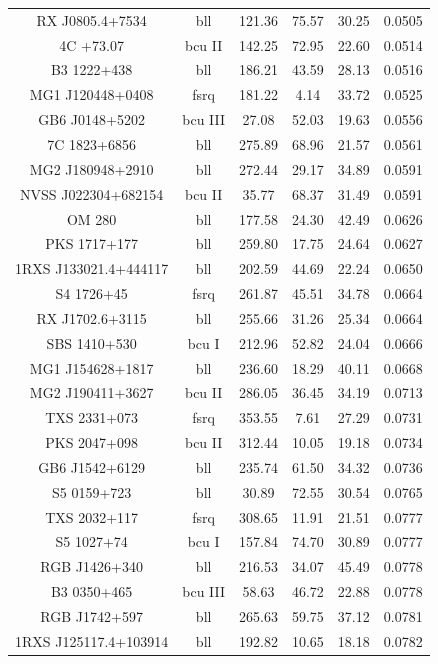 \begin{center}
\begin{longtable}{||cccccc||}
RX J0805.4+7534 &  bll  & 121.36 & 75.57 & 30.25 & 0.0505  \\
4C +73.07 &  bcu II  & 142.25 & 72.95 & 22.60 & 0.0514  \\
B3 1222+438 &  bll  & 186.21 & 43.59 & 28.13 & 0.0516  \\
MG1 J120448+0408 &  fsrq  & 181.22 & 4.14 & 33.72 & 0.0525  \\
GB6 J0148+5202 &  bcu III  & 27.08 & 52.03 & 19.63 & 0.0556  \\
7C 1823+6856 &  bll  & 275.89 & 68.96 & 21.57 & 0.0561  \\
MG2 J180948+2910 &  bll  & 272.44 & 29.17 & 34.89 & 0.0591  \\
NVSS J022304+682154 &  bcu II  & 35.77 & 68.37 & 31.49 & 0.0591  \\
OM 280 &  bll  & 177.58 & 24.30 & 42.49 & 0.0626  \\
PKS 1717+177 &  bll  & 259.80 & 17.75 & 24.64 & 0.0627  \\
1RXS J133021.4+444117 &  bll  & 202.59 & 44.69 & 22.24 & 0.0650  \\
S4 1726+45 &  fsrq  & 261.87 & 45.51 & 34.78 & 0.0664  \\
RX J1702.6+3115 &  bll  & 255.66 & 31.26 & 25.34 & 0.0664  \\
SBS 1410+530 &  bcu I  & 212.96 & 52.82 & 24.04 & 0.0666  \\
MG1 J154628+1817 &  bll  & 236.60 & 18.29 & 40.11 & 0.0668  \\
MG2 J190411+3627 &  bcu II  & 286.05 & 36.45 & 34.19 & 0.0713  \\
TXS 2331+073 &  fsrq  & 353.55 & 7.61 & 27.29 & 0.0731  \\
PKS 2047+098 &  bcu II  & 312.44 & 10.05 & 19.18 & 0.0734  \\
GB6 J1542+6129 &  bll  & 235.74 & 61.50 & 34.32 & 0.0736  \\
S5 0159+723 &  bll  & 30.89 & 72.55 & 30.54 & 0.0765  \\
TXS 2032+117 &  fsrq  & 308.65 & 11.91 & 21.51 & 0.0777  \\
S5 1027+74 &  bcu I  & 157.84 & 74.70 & 30.89 & 0.0777  \\
RGB J1426+340 &  bll  & 216.53 & 34.07 & 45.49 & 0.0778  \\
B3 0350+465 &  bcu III  & 58.63 & 46.72 & 22.88 & 0.0778  \\
RGB J1742+597 &  bll  & 265.63 & 59.75 & 37.12 & 0.0781  \\
1RXS J125117.4+103914 &  bll  & 192.82 & 10.65 & 18.18 & 0.0782  \\

\end{longtable}
\end{center}
